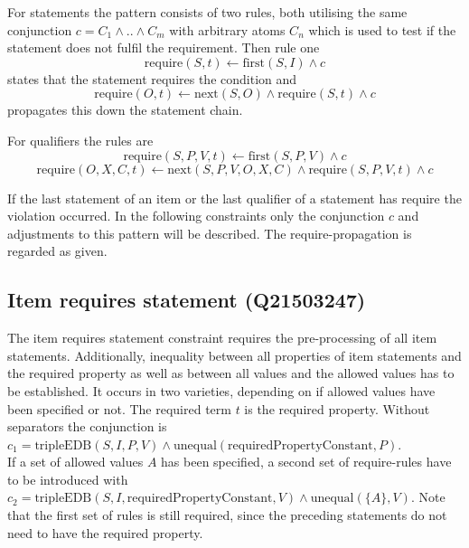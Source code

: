 \documentclass[hyperref,bachelorofscience,fleqn]{cgvpub}
\begin{document}
For statements the pattern consists of two rules, both utilising the same conjunction \(c = C_1 \wedge .. \wedge C_m\) with arbitrary atoms \(C_n\) which is used to test if the statement does not fulfil the requirement. Then rule one
\begin{equation*}
\text{require}(S, t) \leftarrow \text{first}(S, I) \wedge c
\end{equation*}
states that the statement requires the condition and
\begin{equation*}
\text{require}(O, t) \leftarrow \text{next}(S, O) \wedge \text{require}(S, t) \wedge c
\end{equation*}
propagates this down the statement chain.

For qualifiers the rules are
\begin{equation*}
\text{require}(S, P, V, t) \leftarrow \text{first}(S, P, V) \wedge c
\end{equation*}
\begin{equation*}
\text{require}(O, X, C, t) \leftarrow \text{next}(S, P, V, O, X, C) \wedge \text{require}(S, P, V, t) \wedge c
\end{equation*}

If the last statement of an item or the last qualifier of a statement has require the violation occurred. In the following constraints only the conjunction \(c\) and adjustments to this pattern will be described. The require-propagation is regarded as given.

\subsection{Item requires statement (Q21503247)}
The item requires statement constraint requires the pre-processing of all item statements. Additionally, inequality between all properties of item statements and the required property as well as between all values and the allowed values has to be established. It occurs in two varieties, depending on if allowed values have been specified or not. The required term \(t\) is the  required property. Without separators the conjunction is \(c_1 = \text{tripleEDB}(S, I, P, V) \wedge \text{unequal}(\text{requiredPropertyConstant}, P)\).\\

If a set of allowed values \(A\) has been specified, a second set of require-rules have to be introduced with \(c_2 = \text{tripleEDB}(S, I, \text{requiredPropertyConstant}, V) \wedge \text{unequal}(\{A\}, V)\). Note that the first set of rules is still required, since the preceding statements do not need to have the required property.\\
\end{document}
